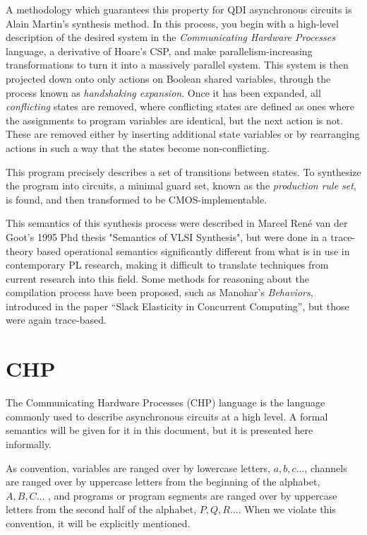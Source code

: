 \documentclass[times, 10pt]{article}
\begin{document}
A methodology which guarantees this property for QDI asynchronous circuits is
Alain Martin's synthesis method.  In this process, you begin with a high-level
description of the desired system in the \emph{Communicating Hardware Processes}
language, a derivative of Hoare's CSP, and make parallelism-increasing
transformations to turn it into a massively parallel system. This system is then
projected down onto only actions on Boolean shared variables, through the
process known as \emph{handshaking expansion}. Once it has been expanded, all
\emph{conflicting} states are removed, where conflicting states are defined as
ones where the assignments to program variables are identical, but the next
action is not.  These are removed either by inserting additional state variables
or by rearranging actions in such a way that the states become non-conflicting.

This program precisely describes a set of transitions between states.  To
synthesize the program into circuits, a minimal guard set, known as the
\emph{production rule set}, is found, and then transformed to be
CMOS-implementable. 

This semantics of this synthesis process were described in Marcel Ren\'{e} van der
Goot's 1995 Phd thesis "Semantics of VLSI Synthesis", but were done in a
trace-theory based operational semantics significantly different from what is in
use in contemporary PL research, making it difficult to translate techniques
from current research into this field. Some methods for reasoning about the
compilation process have been proposed, such as Manohar's \emph{Behaviors},
introduced in the paper ``Slack Elasticity in Concurrent Computing'', but those
were again trace-based.

\section{CHP}

The Communicating Hardware Processes (CHP) language is the language commonly
used to describe asynchronous circuits at a high level.  A formal semantics will
be given for it in this document, but it is presented here informally.

As convention, variables are ranged over by lowercase letters, $a, b, c \ldots$,
channels are ranged over by uppercase letters from the beginning of the
alphabet, $A, B, C \ldots$ ,  and programs or program segments are ranged over
by uppercase letters from the second half of the alphabet, $P, Q, R \ldots$.
When we violate this convention, it will be explicitly mentioned.
\end{document}
